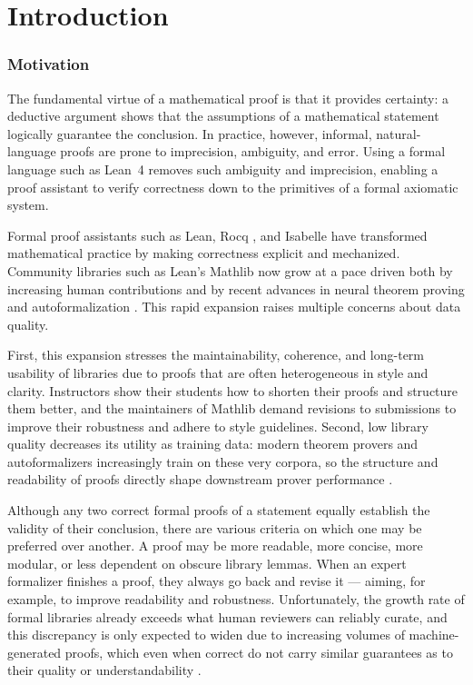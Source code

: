 \chapter{Introduction}\label{chap:intro}

\setlength{\parindent}{1em}

\subsection{Motivation}

The fundamental virtue of a mathematical proof is that it provides certainty: a deductive argument shows that the assumptions of a mathematical statement logically guarantee the conclusion. In practice, however, informal, natural-language proofs are prone to imprecision, ambiguity, and error. Using a formal language such as Lean~4 \cite{LeanTheoremProver} removes such ambiguity and imprecision, enabling a proof assistant to verify correctness down to the primitives of a formal axiomatic system.

Formal proof assistants such as Lean, Rocq \cite{RocqTheoremProver}, and Isabelle \cite{IsabelleTheoremProver} have transformed mathematical practice by making correctness explicit and mechanized. Community libraries such as Lean's Mathlib \cite{Mathlib} now grow at a pace driven both by increasing human contributions and by recent advances in neural theorem proving and autoformalization \cite{achim2025aristotleimolevelautomatedtheorem, alphaproof}. This rapid expansion raises multiple concerns about data quality.

First, this expansion stresses the maintainability, coherence, and long-term usability of libraries due to proofs that are often heterogeneous in style and clarity. Instructors show their students how to shorten their proofs and structure them better, and the maintainers of Mathlib demand revisions to submissions to improve their robustness and adhere to style guidelines. Second, low library quality decreases its utility as training data: modern theorem provers and autoformalizers increasingly train on these very corpora, so the structure and readability of proofs directly shape downstream prover performance \cite{gu2025proofoptimizer}.

Although any two correct formal proofs of a statement equally establish the validity of their conclusion, there are various criteria on which one may be preferred over another. A proof may be more readable, more concise, more modular, or less dependent on obscure library lemmas. When an expert formalizer finishes a proof, they always go back and revise it --- aiming, for example, to improve readability and robustness. Unfortunately, the growth rate of formal libraries already exceeds what human reviewers can reliably curate, and this discrepancy is only expected to widen due to increasing volumes of machine-generated proofs, which even when correct do not carry similar guarantees as to their quality or understandability \cite{SeedProver}.

